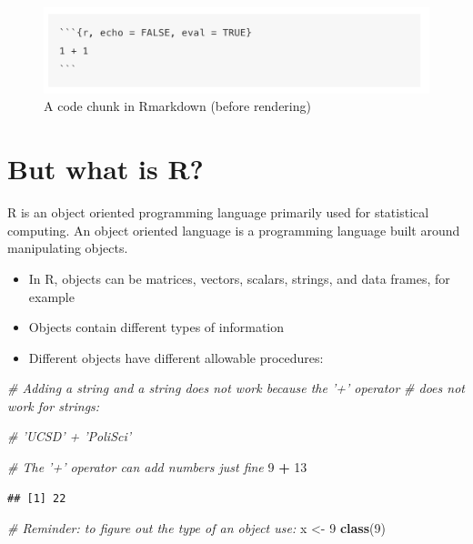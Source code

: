 \documentclass[
]{book}
\newenvironment{Shaded}{\begin{snugshade}}{\end{snugshade}}
\newcommand{\CommentTok}[1]{\textcolor[rgb]{0.56,0.35,0.01}{\textit{#1}}}
\newcommand{\DecValTok}[1]{\textcolor[rgb]{0.00,0.00,0.81}{#1}}
\newcommand{\KeywordTok}[1]{\textcolor[rgb]{0.13,0.29,0.53}{\textbf{#1}}}
\newcommand{\NormalTok}[1]{#1}
\newcommand{\OperatorTok}[1]{\textcolor[rgb]{0.81,0.36,0.00}{\textbf{#1}}}
\newcommand{\StringTok}[1]{\textcolor[rgb]{0.31,0.60,0.02}{#1}}
\providecommand{\tightlist}{%
  \setlength{\itemsep}{0pt}\setlength{\parskip}{0pt}}
\theoremstyle{definition}
\theoremstyle{definition}
\theoremstyle{definition}
\theoremstyle{definition}
\theoremstyle{remark}
\begin{document}
\begin{figure}
\centering
\includegraphics{images/11_4_codechunk.png}
\caption{A code chunk in Rmarkdown (before rendering)}
\end{figure}

\newpage

\hypertarget{but-what-is-r}{%
\section{But what is R?}\label{but-what-is-r}}

R is an object oriented programming language primarily used for statistical computing. An object oriented language is a programming language built around manipulating objects.

\begin{itemize}
\tightlist
\item
  In R, objects can be matrices, vectors, scalars, strings, and data frames, for example
\item
  Objects contain different types of information
\item
  Different objects have different allowable procedures:
\end{itemize}

\begin{Shaded}
\begin{Highlighting}[]
\CommentTok{# Adding a string and a string does not work because the '+' operator }
\CommentTok{# does not work for strings:}

\CommentTok{# 'UCSD' + 'PoliSci'}

\CommentTok{# The '+' operator can add numbers just fine}
\DecValTok{9} \OperatorTok{+}\StringTok{ }\DecValTok{13}
\end{Highlighting}
\end{Shaded}

\begin{verbatim}
## [1] 22
\end{verbatim}

\begin{Shaded}
\begin{Highlighting}[]
\CommentTok{# Reminder: to figure out the type of an object use:}
\NormalTok{x <-}\StringTok{ }\DecValTok{9}
\KeywordTok{class}\NormalTok{(}\DecValTok{9}\NormalTok{)}
\end{Highlighting}
\end{Shaded}
\end{document}
